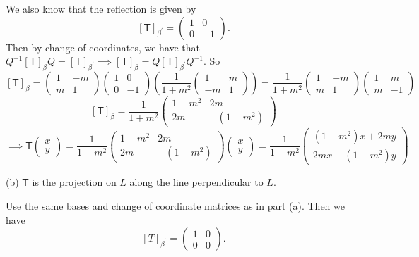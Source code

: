 \documentclass[11pt]{article}
\newcommand{\br}[1]{\left(#1\right)}
\newcommand{\sbr}[1]{\left[#1\right]}
\begin{document}
We also know that the reflection is given by $$\sbr{\mathsf{T}}_{\beta^{\prime}} = \begin{pmatrix}
    1 & 0 \\
    0 & -1
\end{pmatrix}.$$ Then by change of coordinates, we have that $Q^{-1}\sbr{\mathsf{T}}_{\beta}Q = \sbr{\mathsf{T}}_{\beta^{\prime}} \implies \sbr{\mathsf{T}}_{\beta} = Q\sbr{\mathsf{T}}_{\beta^{\prime}}Q^{-1}$. So $$\sbr{\mathsf{T}}_{\beta} = \begin{pmatrix}
    1 & -m \\
    m & 1
\end{pmatrix} \begin{pmatrix}
    1 & 0 \\
    0 & -1
\end{pmatrix} \br{\frac{1}{1+m^2}\begin{pmatrix}
    1 & m \\
    -m & 1
\end{pmatrix}} = \frac{1}{1+m^2}\begin{pmatrix}
    1 & -m \\
    m & 1
\end{pmatrix} \begin{pmatrix}
    1 & m \\
    m & -1
\end{pmatrix}$$
$$\sbr{\mathsf{T}}_{\beta} = \frac{1}{1+m^2}\begin{pmatrix}
    1-m^2 & 2m \\
    2m & -(1-m^2)
\end{pmatrix}$$
$$\implies \mathsf{T} \begin{pmatrix} x \\ y \end{pmatrix} = \frac{1}{1+m^2}\begin{pmatrix}
    1-m^2 & 2m \\
    2m & -(1-m^2)
\end{pmatrix} \begin{pmatrix}
    x \\ y
\end{pmatrix} = \frac{1}{1+m^2}\begin{pmatrix}
    (1-m^2)x + 2my \\
    2mx  -(1-m^2)y
\end{pmatrix}$$

(b) $\mathsf{T}$ is the projection on $L$ along the line perpendicular to $L$. 

Use the same bases and change of coordinate matrices as in part (a). Then we have $$\sbr{T}_{\beta^{\prime}} = \begin{pmatrix}
    1 & 0 \\
    0 & 0
\end{pmatrix}.$$
\end{document}
